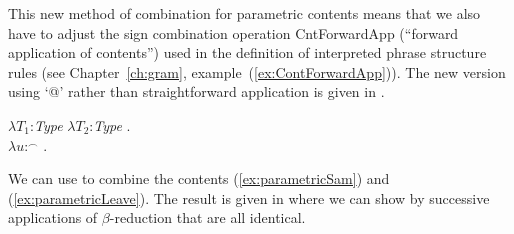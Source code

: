 This new method of combination for parametric contents means that we
also have to adjust the sign combination operation CntForwardApp
(``forward application of contents'') used in the definition of
interpreted phrase structure rules (see Chapter~\ref{ch:gram},
example~(\ref{ex:ContForwardApp})).  The new version using `@' rather
than straightforward application is given in \nexteg{}.
\begin{ex} 
$\lambda T_1$:\textit{Type} $\lambda T_2$:\textit{Type} . \\
\hspace*{1em}$\lambda
u$:$^{\frown}$
    . \\
\hspace*{2em}  
\end{ex} 
  

We can use \preveg{} to combine the contents (\ref{ex:parametricSam}) and
(\ref{ex:parametricLeave}).  The result is given in \nexteg{} where we can
show by successive applications of $\beta$-reduction that
 are all identical.



